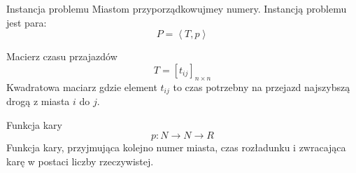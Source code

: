 \begin{frame}
	\begin{block}{Instancja problemu}
		Miastom przyporządkowujmey numery.
		Instancją problemu jest para:
		\begin{equation}
			P = \left< T, p \right>
		\end{equation}
	\end{block}
	\begin{block}{Macierz czasu przajazdów}		
		\begin{equation}
			T = \left[ t_{ij} \right]_{n \times n} 
		\end{equation}
		Kwadratowa maciarz gdzie element $t_{ij}$ to czas potrzebny na przejazd najszybszą drogą z miasta $i$ do $j$.
	\end{block}
	\begin{block}{Funkcja kary}
		\begin{equation}
			p : N \rightarrow N \rightarrow R 
		\end{equation}
		Funkcja kary, przyjmująca kolejno numer miasta, czas rozładunku i zwracająca karę w postaci liczby rzeczywistej.
	\end{block}
\end{frame}

